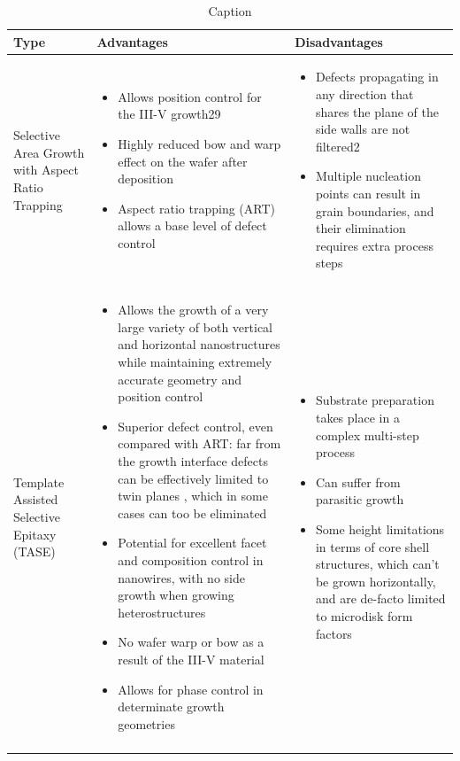     \begin{table}
    \centering
    \begin{longtable}{p{}|p{}|p{}}
    Type & Advantages & Disadvantages \\ \hline \hline
    Selective Area Growth with Aspect Ratio Trapping & 
    \begin{itemize}
        \item Allows position control for the III-V growth29
        \item Highly reduced bow and warp effect on the wafer after deposition
        \item Aspect ratio trapping (ART) allows a base level of defect control \cite{Han2016}
    \end{itemize}  & \begin{itemize}
        \item Defects propagating in any direction that shares the plane of the side walls are not filtered2
        \item Multiple nucleation points can result in grain boundaries, and their elimination requires extra process steps \cite{Kunert2016}
    \end{itemize} \\ \hline
    Template Assisted Selective Epitaxy (TASE) & 
    \begin{itemize}
        \item Allows the growth of a very large variety of both vertical and horizontal nanostructures while maintaining extremely accurate geometry and  position control \cite{Ritter2021, Tiwari2020, Schmid2015}
        \item Superior defect control, even compared with ART: far from the growth interface defects can be effectively limited to twin planes \cite{Han2020}, which in some cases can too be eliminated \cite{Knoedler2017}
        \item Potential for excellent facet and composition \cite{Borg2019, Goswami2020} control in nanowires, with no side growth when growing heterostructures \cite{Brunelli2019} 
        \item No wafer warp or bow as a result of the III-V material
        \item Allows for phase control in determinate growth geometries \cite{Staudinger2018}
    \end{itemize} & 
    \begin{itemize}
        \item Substrate preparation takes place in a complex multi-step process
        \item Can suffer from parasitic growth
        \item Some height limitations in terms of core shell structures, which can’t be grown horizontally, and are de-facto limited to microdisk form factors \cite{Tiwari2020}
    \end{itemize} \\ \hline
    \caption{Caption}
    \label{tab:methods2}
\end{longtable}
\end{table}

